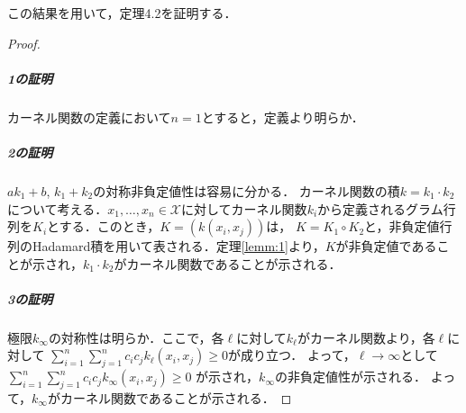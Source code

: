 \documentclass[dvipdfmx]{jsarticle}
\begin{document}
この結果を用いて，定理4.2を証明する．
\begin{proof}
  \subparagraph{1の証明}
  カーネル関数の定義において$n = 1$とすると，定義より明らか．

  \subparagraph{2の証明}
  $a k_1 + b$, $k_1 + k_2$の対称非負定値性は容易に分かる．
  カーネル関数の積$k = k_1 \cdot k_2$について考える．$x_1, \ldots, x_n \in \mathcal{X}$に対してカーネル関数$k_i$から定義されるグラム行列を$K_i$とする．このとき，$K = (k(x_i, x_j))$は，
  $K = K_1 \circ K_2$と，非負定値行列のHadamard積を用いて表される．定理\ref{lemm:1}より，$K$が非負定値であることが示され，$k_1 \cdot k_2$がカーネル関数であることが示される．

  \subparagraph{3の証明}
  極限$k_{\infty}$の対称性は明らか．ここで，各$\ell$に対して$k_{\ell}$がカーネル関数より，各$\ell$に対して
  $\sum_{i = 1}^n \sum_{j = 1}^n c_i c_j k_{\ell}(x_i, x_j) \geq 0$が成り立つ．
  よって，$\ell \to \infty$として
  $\sum_{i = 1}^n \sum_{j = 1}^n c_i c_j k_{\infty}(x_i, x_j) \geq 0$
  が示され，$k_{\infty}$の非負定値性が示される．
  よって，$k_{\infty}$がカーネル関数であることが示される．
\end{proof}
\end{document}
